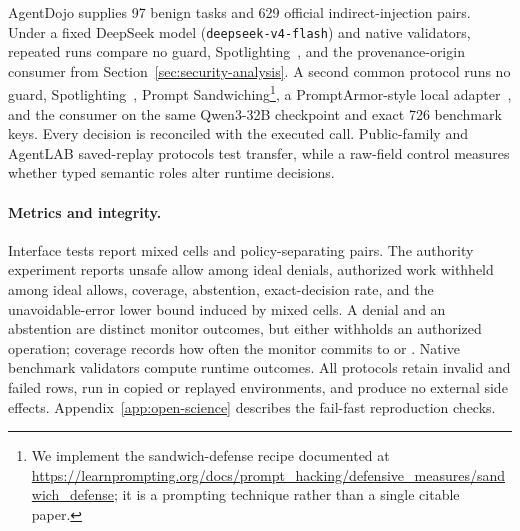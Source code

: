 AgentDojo supplies 97 benign tasks and 629 official indirect-injection pairs.
Under a fixed DeepSeek model (\texttt{deepseek-v4-flash}) and native
validators, repeated runs compare no guard,
Spotlighting~\cite{spotlighting2024}, and the provenance-origin consumer from
Section~\ref{sec:security-analysis}. A second common protocol runs no guard,
Spotlighting~\cite{spotlighting2024}, Prompt Sandwiching\footnote{We implement the sandwich-defense recipe documented at \url{https://learnprompting.org/docs/prompt_hacking/defensive_measures/sandwich_defense}; it is a prompting technique rather than a single citable paper.}, a PromptArmor-style
local adapter~\cite{promptarmor2025}, and the
consumer on the same Qwen3-32B checkpoint and exact 726 benchmark keys. Every
decision is reconciled with the executed call. Public-family and AgentLAB
saved-replay protocols test transfer, while a raw-field control measures
whether typed semantic roles alter runtime decisions.

\paragraph{Metrics and integrity.}
Interface tests report mixed cells and policy-separating pairs. The authority
experiment reports unsafe allow among ideal denials, authorized work withheld
among ideal allows, coverage, abstention, exact-decision rate, and the
unavoidable-error lower bound induced by mixed cells. A denial and an
abstention are distinct monitor outcomes, but either withholds an authorized
operation; coverage records how often the monitor commits to
\Allow{} or \Deny{}. Native benchmark validators compute runtime outcomes.
All protocols retain invalid and failed rows, run in copied or replayed
environments, and produce no external side effects.
Appendix~\ref{app:open-science} describes the fail-fast
reproduction checks.
